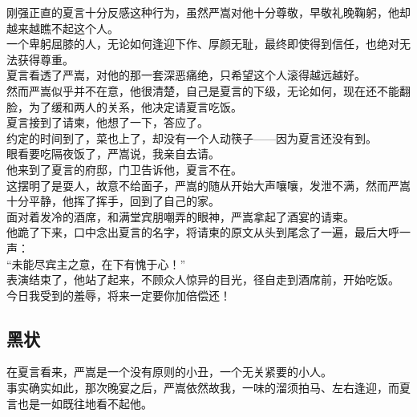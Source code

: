 \begin{multicols}{\theparacolNo}
刚强正直的夏言十分反感这种行为，虽然严嵩对他十分尊敬，早敬礼晚鞠躬，他却越来越瞧不起这个人。\\

一个卑躬屈膝的人，无论如何逢迎下作、厚颜无耻，最终即使得到信任，也绝对无法获得尊重。\\

夏言看透了严嵩，对他的那一套深恶痛绝，只希望这个人滚得越远越好。\\

然而严嵩似乎并不在意，他很清楚，自己是夏言的下级，无论如何，现在还不能翻脸，为了缓和两人的关系，他决定请夏言吃饭。\\

夏言接到了请柬，他想了一下，答应了。\\

约定的时间到了，菜也上了，却没有一个人动筷子——因为夏言还没有到。\\

眼看要吃隔夜饭了，严嵩说，我亲自去请。\\

他来到了夏言的府邸，门卫告诉他，夏言不在。\\

这摆明了是耍人，故意不给面子，严嵩的随从开始大声嚷嚷，发泄不满，然而严嵩十分平静，他挥了挥手，回到了自己的家。\\

面对着发冷的酒席，和满堂宾朋嘲弄的眼神，严嵩拿起了酒宴的请柬。\\

他跪了下来，口中念出夏言的名字，将请柬的原文从头到尾念了一遍，最后大呼一声：\\

“未能尽宾主之意，在下有愧于心！”\\

表演结束了，他站了起来，不顾众人惊异的目光，径自走到酒席前，开始吃饭。\\

今日我受到的羞辱，将来一定要你加倍偿还！\\

\subsection{黑状}
在夏言看来，严嵩是一个没有原则的小丑，一个无关紧要的小人。\\

事实确实如此，那次晚宴之后，严嵩依然故我，一味的溜须拍马、左右逢迎，而夏言也是一如既往地看不起他。\\


\end{multicols}
